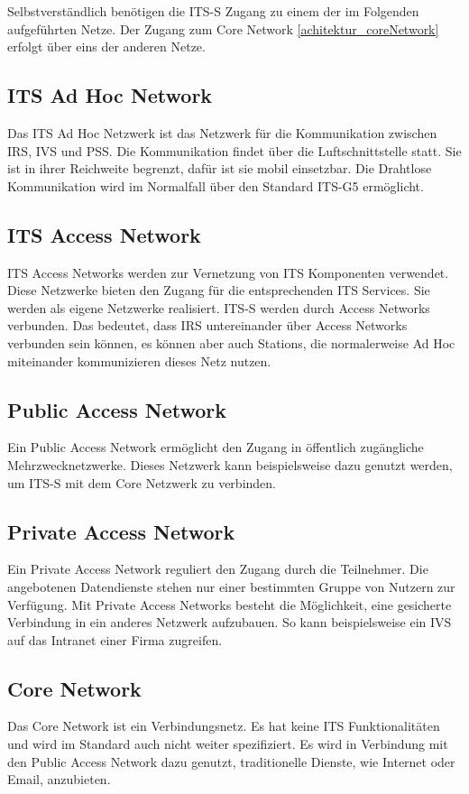 Selbstverständlich benötigen die \ac{ITS-S} Zugang zu einem der im Folgenden aufgeführten Netze. Der Zugang zum Core Network \ref{achitektur_coreNetwork} erfolgt über eins der anderen Netze. 

\subsection{ITS Ad Hoc Network\label{achitektur_adHocNetwork}}
Das \ac{ITS} Ad Hoc Netzwerk ist das Netzwerk für die Kommunikation zwischen \ac{IRS}, \ac{IVS} und \ac{PSS}. Die Kommunikation findet über die Luftschnittstelle statt. Sie ist in ihrer Reichweite begrenzt, dafür ist sie mobil einsetzbar. Die Drahtlose Kommunikation wird im Normalfall über den Standard ITS-G5 ermöglicht.


\subsection{ITS Access Network \label{architektur_itsAccessNetwork}}
ITS Access Networks werden zur Vernetzung von \ac{ITS} Komponenten verwendet. Diese Netzwerke bieten den Zugang für die entsprechenden \ac{ITS} Services. Sie werden als eigene Netzwerke realisiert. \ac{ITS-S} werden durch Access Networks verbunden. Das bedeutet, dass \ac{IRS} untereinander über Access Networks verbunden sein können, es können aber auch Stations, die normalerweise Ad Hoc miteinander kommunizieren dieses Netz nutzen. 

\subsection{Public Access Network}
Ein Public Access Network ermöglicht den Zugang in öffentlich zugängliche Mehrzwecknetzwerke. Dieses Netzwerk kann beispielsweise dazu genutzt werden, um \ac{ITS-S} mit dem Core Netzwerk zu verbinden. 

\subsection{Private Access Network}
Ein Private Access Network reguliert den Zugang durch die Teilnehmer. Die angebotenen Datendienste stehen nur einer bestimmten Gruppe von Nutzern zur Verfügung. Mit Private Access Networks besteht die Möglichkeit, eine gesicherte Verbindung in ein anderes Netzwerk aufzubauen. So kann beispielsweise ein \ac{IVS} auf das Intranet einer Firma zugreifen. 

\subsection{Core Network \label{achitektur_coreNetwork}}
Das Core Network ist ein Verbindungsnetz. Es hat keine \ac{ITS} Funktionalitäten und wird im Standard auch nicht weiter spezifiziert. Es wird in Verbindung mit den Public Access Network dazu genutzt, traditionelle Dienste, wie Internet oder Email, anzubieten.
 
